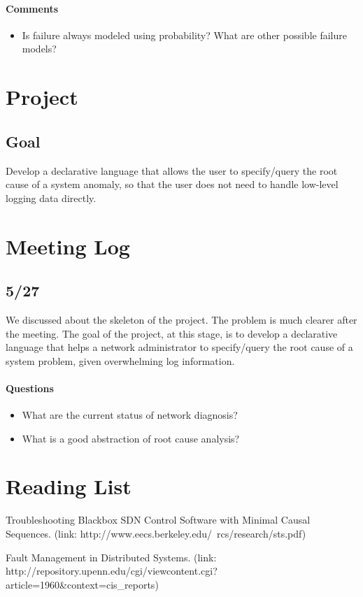 \documentclass{article}
\begin{document}
\paragraph{Comments}

\begin{itemize}
\item Is failure always modeled using probability? What are other possible
  failure models?
\end{itemize}

\section{Project}
\label{sec:project}

\subsection{Goal}
\label{sec:proj:goal}

Develop a declarative language that allows the user to specify/query the root
cause of a system anomaly, so that the user does not need to handle low-level
logging data directly.

\section{Meeting Log}
\label{sec:meetlog}

\subsection{5/27}

We discussed about the skeleton of the project. The problem is much clearer
after the meeting. The goal of the project, at this stage, is to develop a
declarative language that helps a network administrator to specify/query the root cause of a
system problem, given overwhelming log information.

\paragraph{Questions}

\begin{itemize}
\item What are the current status of network diagnosis?
\item What is a good abstraction of root cause analysis?
\end{itemize}

\section{Reading List}
\label{sec:read}

Troubleshooting Blackbox SDN Control Software with Minimal Causal
Sequences. (link: http://www.eecs.berkeley.edu/~rcs/research/sts.pdf)

Fault Management in Distributed Systems. (link:
http://repository.upenn.edu/cgi/viewcontent.cgi?article=1960&context=cis_reports) 

{}

\end{document}
